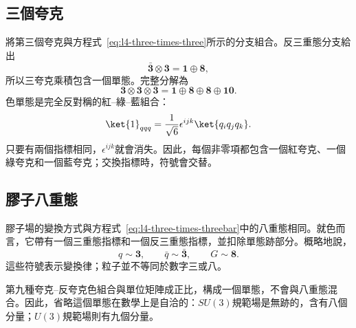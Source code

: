 \subsection{三個夸克}

將第三個夸克與方程式~\eqref{eq:l4-three-times-three}所示的分支組合。反三重態分支給出
\begin{equation}
\bar{\boldsymbol 3}\otimes\boldsymbol 3
=\boldsymbol 1\oplus\boldsymbol 8,
\end{equation}
所以三夸克乘積包含一個單態。完整分解為
\begin{equation}
\boldsymbol 3\otimes\boldsymbol 3\otimes\boldsymbol 3
=\boldsymbol 1\oplus\boldsymbol 8\oplus\boldsymbol 8
\oplus\boldsymbol{10}.
\label{eq:l4-three-quark-full}
\end{equation}
色單態是完全反對稱的紅--綠--藍組合：
\begin{equation}
\ket{1}_{qqq}
=\frac{1}{\sqrt6}\epsilon^{ijk}\ket{q_iq_jq_k}.
\label{eq:l4-baryon-singlet}
\end{equation}
只要有兩個指標相同，\(\epsilon^{ijk}\)就會消失。因此，每個非零項都包含一個紅夸克、一個綠夸克和一個藍夸克；交換指標時，符號會交替。

\begin{classroomqa}
\end{classroomqa}

\subsection{膠子八重態}

膠子場的變換方式與方程式~\eqref{eq:l4-three-times-threebar}中的八重態相同。就色而言，它帶有一個三重態指標和一個反三重態指標，並扣除單態跡部分。概略地說，
\begin{equation}
q\sim\boldsymbol 3,
\qquad
\bar q\sim\bar{\boldsymbol 3},
\qquad
G\sim\boldsymbol 8.
\end{equation}
這些符號表示變換律；粒子並不等同於數字三或八。

第九種夸克--反夸克色組合與單位矩陣成正比，構成一個單態，不會與八重態混合。因此，省略這個單態在數學上是自洽的：\(SU(3)\)規範場是無跡的，含有八個分量；\(U(3)\)規範場則有九個分量。

\begin{classroomqa}
\end{classroomqa}

